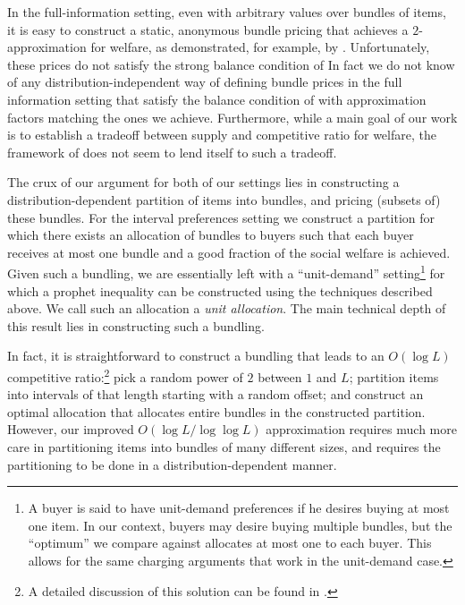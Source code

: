 In the full-information setting, even with arbitrary values over
bundles of items, it is easy to construct a static, anonymous bundle
pricing that achieves a $2$-approximation for welfare, as
demonstrated, for example, by \citet{Cohen-Addad-16}.
Unfortunately, these prices do not satisfy the strong balance
condition of \citeauthor{DFKL-17} In fact we do not know of any
distribution-independent way of defining bundle prices in the full
information setting that satisfy the balance condition of
\citeauthor{DFKL-17} with approximation factors matching the ones we
achieve. Furthermore, while a main goal of our work is to establish a
tradeoff between supply and competitive ratio for welfare, the
framework of \citeauthor{DFKL-17} does not seem to lend itself to such
a tradeoff.

The crux of our argument for both of our settings lies in constructing a
distribution-dependent partition of items into bundles, and pricing (subsets
of) these bundles. For the interval preferences setting we construct a
partition for which there exists an allocation of bundles to buyers such that
each buyer receives at most one bundle and a good fraction of the social
welfare is achieved. Given such a bundling, we are essentially left with a
``unit-demand'' setting\footnote{A buyer is said to have unit-demand
  preferences if he desires buying at most one item. In our context, buyers may
  desire buying multiple bundles, but the ``optimum'' we compare against
  allocates at most one to each buyer. This allows for the same charging
  arguments that work in the unit-demand case.} for which a prophet inequality
can be constructed using the techniques described above.  We call such an
allocation a {\em unit allocation}. The main technical depth of this result
lies in constructing such a bundling.

In fact, it is straightforward to construct a bundling that leads to an $O(\log
L)$ competitive ratio:\footnote{A detailed discussion of this solution can be
  found in \cite{im2011secretary}.} pick a random power of $2$ between $1$ and
$L$; partition items into intervals of that length starting with a random
offset; and construct an optimal allocation that allocates entire bundles in
the constructed partition. However, our improved $O(\log L/\log\log L)$
approximation requires much more care in partitioning items into bundles of
many different sizes, and requires the partitioning to be done in a
distribution-dependent manner.


